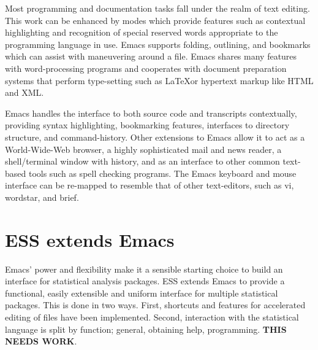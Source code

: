 \documentclass{article}
\begin{document}
Most programming and documentation tasks fall under the realm of text
editing.  This work can be enhanced by modes which provide features such 
as contextual highlighting and recognition of special reserved words 
appropriate to the programming language in use.  Emacs supports
folding, outlining, and bookmarks which can assist with maneuvering
around a file.  Emacs shares many features with word-processing
programs and cooperates with document preparation systems
that perform type-setting such as \LaTeX or hypertext markup
like HTML and XML.


 Emacs handles the
interface to both source code and transcripts contextually, providing
syntax highlighting, bookmarking features, interfaces to directory
structure, and command-history.  Other extensions to Emacs allow it to
act as a World-Wide-Web browser, a highly sophisticated mail and news
reader, a shell/terminal window with history, and as an interface to
other common text-based tools such as spell checking programs.  The
Emacs keyboard and mouse interface can be re-mapped to resemble that
of other text-editors, such as vi, wordstar, and brief.


\section{ESS extends Emacs}
\label{sec:ess-extends-emacs}

Emacs' power and flexibility make it a sensible starting choice to
build an interface for statistical analysis packages.  ESS extends
Emacs to provide a functional, easily extensible and uniform interface
for multiple statistical packages.  This is done in two ways.  First,
shortcuts and features for accelerated editing of files have been
implemented.  Second, interaction with the statistical
language is split by function; general, obtaining help, programming.
\textbf{THIS NEEDS WORK}.

\end{document}
